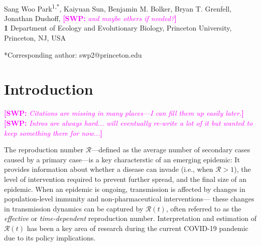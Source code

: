 \documentclass[12pt]{article}
\date{\today}
\newcommand{\comment}{\showcomment}
\newcommand{\showcomment}[3]{\textcolor{#1}{\textbf{[#2: }\textsl{#3}\textbf{]}}}
\newcommand{\swp}[1]{\comment{magenta}{SWP}{#1}}
\newcommand{\RR}{\ensuremath{{\mathcal R}}\xspace}
\begin{document}
\begin{flushleft}{
	\Large
	\textbf{}
}
\newline
\\
Sang Woo Park\textsuperscript{1,*}, Kaiyuan Sun, Benjamin M. Bolker, Bryan T. Grenfell, Jonathan Dushoff, \swp{and maybe others if needed?}
\\
\bigskip
\textbf{1} Department of Ecology and Evolutionary Biology, Princeton University, Princeton, NJ, USA
\\
\bigskip

*Corresponding author: swp2@princeton.edu
\end{flushleft}

\section{Introduction}

\swp{Citations are missing in many places---I can fill them up easily later.}
\swp{Intros are always hard... will eventually re-write a lot of it but wanted to keep something there for now...}

The reproduction number \RR---defined as the average number of secondary cases caused by a primary case---is a key characterstic of an emerging epidemic:
It provides information about whether a disease can invade (i.e., when $\RR > 1$), the level of intervention required to prevent further spread, and the final size of an epidemic.
When an epidemic is ongoing, transmission is affected by changes in population-level immunity and non-pharmaceutical interventions---
these changes in transmission dynamics can be captured by $\RR(t)$, often referred to as the \emph{effective} or \emph{time-dependent} reproduction number.
Interpretation and estimation of $\RR(t)$ has been a key area of research during the current COVID-19 pandemic due to its policy implications.
\end{document}
